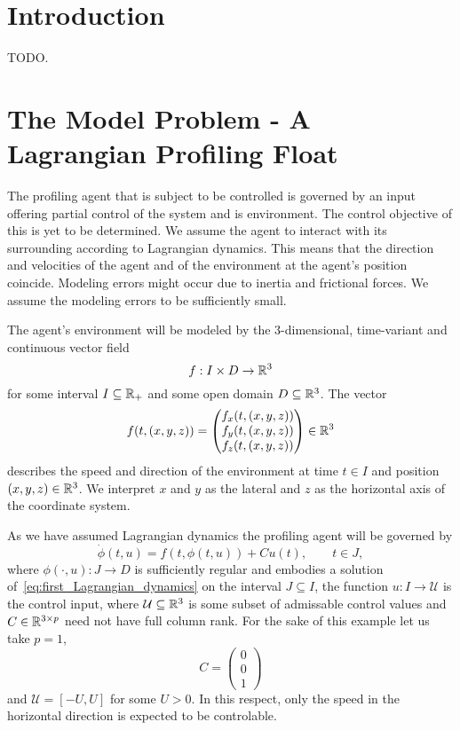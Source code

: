 \documentclass[../Master.tex]{subfiles}
\begin{document}
\section{Introduction}

TODO.

\section{The Model Problem - A Lagrangian Profiling Float}

The profiling agent that is subject to be controlled is governed by an input offering partial control of the system and is environment. The control objective of this is yet to be determined. We assume the agent to interact with its surrounding according to Lagrangian dynamics. This means that the direction and velocities of the agent and of the environment at the agent's position coincide. Modeling errors might occur due to inertia and frictional forces. We assume the modeling errors to be sufficiently small.

The agent's environment will be modeled by the \(3\)-dimensional, time-variant and continuous vector field
\begin{equation*}
  f: I \times D \to \mathbb{R}^3
\end{equation*}
for some interval \(I \subseteq \mathbb{R}_+\) and some open domain \(D \subseteq \mathbb{R}^3\). The vector 
\begin{equation*}
  f(t,(x,y,z)) = \begin{pmatrix}
    f_x(t,(x,y,z)) \\
    f_y(t,(x,y,z)) \\ 
    f_z(t,(x,y,z))
  \end{pmatrix} \in \mathbb{R}^3
\end{equation*}
describes the speed and direction of the environment at time \(t \in I\) and position \((x,y,z) \in \mathbb{R}^3\). We interpret \(x\) and \(y\) as the lateral and \(z\) as the horizontal axis of the coordinate system.

As we have assumed Lagrangian dynamics the profiling agent will be governed by
\begin{equation}\label{eq:first_Lagrangian_dynamics}
  \dot{\phi}(t, u) = f(t, \phi(t, u)) + C u(t), \qquad t \in J,
\end{equation}
where \(\phi(\cdot, u): J \to D\) is sufficiently regular and embodies a solution of~\eqref{eq:first_Lagrangian_dynamics} on the interval \(J \subseteq I\), the function \(u: I \to \mathcal{U}\) is the control input, where \(\mathcal{U} \subseteq \mathbb{R}^3\) is some subset of admissable control values and \(C \in \mathbb{R}^{3 \times p}\) need not have full column rank. For the sake of this example let us take \(p = 1\),
\begin{equation*}
  C = 
  \begin{pmatrix}
    0 \\
    0 \\
    1
  \end{pmatrix}
\end{equation*}
and \(\mathcal{U} = [-U, U]\) for some \(U > 0\).
In this respect, only the speed in the horizontal direction is expected to be controlable. 
\end{document}
